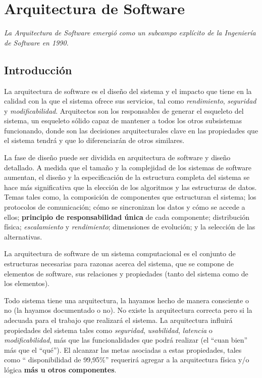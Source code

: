 
\chapter{Arquitectura de Software}

\begin{flushright}
    \textit{La Arquitectura de Software emergió como un subcampo explícito de la Ingeniería de Software en 1990.}
\end{flushright}
% 
\section{Introducción}
La arquitectura de software es el diseño del sistema y el impacto que tiene en la calidad con la que el sistema ofrece sus servicios, tal como \textit{rendimiento}, \textit{seguridad} y \textit{modificabilidad}. Arquitectos son los responsables de generar el esqueleto del sistema, un esqueleto sólido capaz de mantener a todos los otros subsistemas funcionando, donde son las decisiones arquitecturales clave en las propiedades que el sistema tendrá y que lo diferenciarán de otros similares.

La fase de diseño puede ser dividida en arquitectura de software y diseño detallado. A medida que el tamaño y la complejidad de los sistemas de software aumentan, el diseño y la especificación de la estructura completa del sistema se hace más significativa que la elección de los algoritmos y las estructuras de datos. Temas tales como, la composición de componentes que estructuran el sistema; los protocolos de comunicación; cómo se sincronizan los datos y cómo se accede a ellos; \textbf{principio de responsabilidad única} de cada componente; distribución física; \textit{escalamiento} y \textit{rendimiento}; dimensiones de evolución; y la selección de las alternativas.

\begin{tcolorbox}[colback=gray!5!white,colframe=orange!60!gray,title=Arquitectura de Software]
La arquitectura de software de un sistema computacional es el conjunto de estructuras necesarias para razonas acerca del sistema, que se compone de elementos de software, sus relaciones y propiedades (tanto del sistema como de los elementos).
\end{tcolorbox}

Todo sistema tiene una arquitectura, la hayamos hecho de manera consciente o no (la hayamos documentado o no). No existe la arquitectura correcta pero si la adecuada para el trabajo que realizará el sistema. La arquitectura influirá propiedades del sistema tales como \textit{seguridad}, \textit{usabilidad}, \textit{latencia} o \textit{modificabilidad}, más que las funcionalidades que podrá realizar (el ``cuan bien'' más que el ``qué''). El alcanzar las metas asociadas a estas propiedades, tales como `` disponibilidad de 99,95\%'' requerirá agregar a la arquitectura física y/o lógica \textbf{más u otros componentes}.

